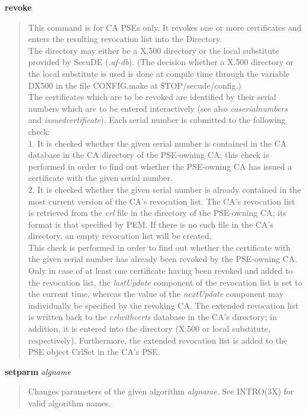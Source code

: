 {\bf revoke} 
\begin{quote}
This command is for CA PSEs only.
It revokes one or more certificates and enters the resulting revocation list into the 
Directory. \\
The directory may either be a X.500 directory or the local substitute provided by 
SecuDE ({\em .af-db}). (The decision whether a X.500 directory or the local substitute 
is used is done at compile time through the variable DX500 in the file CONFIG.make
at \$TOP/secude/config.) \\
The certificates which are to be revoked are identified by their serial numbers which are to be
entered interactively (see also {\em caserialnumbers} and {\em issuedcertificate}). 
Each serial number is submitted to the following check: \\
1. It is checked whether the given serial number is contained in the CA database in the
CA directory of the PSE-owning CA; this check is performed in order to find out whether the 
PSE-owning CA has issued a certificate with the given serial number. \\
2. It is checked whether the given serial number is already contained in the most current version
of the CA's revocation list. The CA's revocation list is retrieved from the {\em crl} file
in the directory of the PSE-owning CA; its format is that specified by PEM. If there is no 
such file in the CA's directory, an empty revocation list will be created. \\
This check is performed in order to find out whether the certificate with the given serial number 
has already been revoked by the PSE-owning CA. \\
Only in case of at least one certificate having been revoked and added to the revocation list, the 
{\em lastUpdate} component of the revocation list is set to the current time, whereas the value 
of the {\em nextUpdate} component may individually be specified by the revoking CA. The extended
revocation list is written back to the {\em crlwithcerts} database in the CA's directory; in addition, 
it is entered into the directory (X.500 or local substitute, respectively). 
Furthermore, the extended revocation list is added to the PSE object CrlSet in the CA's PSE.
\end{quote}

{\bf setparm} {\em algname}
\begin{quote}
Changes parameters of the given algorithm {\em algname}. See INTRO(3X) for valid algorithm names.
\end{quote}

